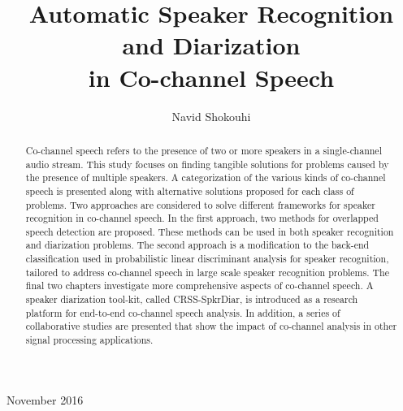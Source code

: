 \documentclass[doublespacing]{utdthesis}
\author{Navid Shokouhi}
\title{Automatic Speaker Recognition and Diarization \\
		in Co-channel Speech}
\begin{document}
\frontmatter

\signaturepage


\maketitle

\begin{acks}{November 2016} %

\end{acks}

\begin{preface} %
\end{preface}

\begin{abstract}
Co-channel speech refers to the presence of two or more speakers in a single-channel audio stream. 
This study focuses on finding tangible solutions for problems caused by the presence of multiple speakers. 
A categorization of the various kinds of co-channel speech is presented along with alternative solutions proposed for each class of problems. 
Two approaches are considered to solve different frameworks for speaker recognition in co-channel speech. 
In the first approach, two methods for overlapped speech detection are proposed. 
These methods can be used in both speaker recognition and diarization problems. 
The second approach is a modification to the back-end classification used in probabilistic linear discriminant analysis for speaker recognition, tailored to address co-channel speech in large scale speaker recognition problems. 
The final two chapters investigate more comprehensive aspects of co-channel speech. 
A speaker diarization tool-kit, called CRSS-SpkrDiar, is introduced as a research platform for end-to-end co-channel speech analysis. 
In addition, a series of collaborative studies are presented that show the impact of co-channel analysis in other signal processing applications. 


\end{abstract}
\end{document}
